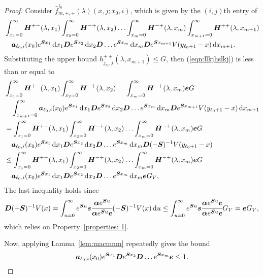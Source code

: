 \begin{proof}
	Consider \(\widehat f^{\ell_0}_{m,+,+}(\lambda)(x,j;x_0,i) \), which is given by the \((i,j)\)th entry of
        \begin{align}
        	&\int_{x_1=0}^\infty \boldsymbol H^{+-}(\lambda,x_1)\nonumber
	\int_{x_2=0}^\infty \boldsymbol H^{-+}(\lambda,x_2) 
	\hdots \int_{x_m=0}^\infty \boldsymbol H^{-+}(\lambda, x_m) 
	\int_{x_{m+1}=0}^\infty \boldsymbol H^{++}(\lambda,x_{m+1}) 
	\\&\quad\boldsymbol   a_{\ell_0,i}(x_0)e^{\boldsymbol{S}x_1}\, \mathrm{d} x_1 \boldsymbol{D}e^{\boldsymbol{S}x_2} \, \mathrm{d} x_2 \boldsymbol{D}\dots e^{\boldsymbol{S}x_m} \, \mathrm{d} x_m \boldsymbol{D}e^{\boldsymbol{S}x_{m+1}}V(y_{\ell_0+1}-x) \, \mathrm{d} x_{m+1}. \label{eqn:llkjhslkj}
\end{align}
	Substituting the upper bound \(h^{++}_{j_m,j}(\lambda,x_{m+1})\leq G\), then (\ref{eqn:llkjhslkj}) is less than or equal to 
	\begin{align}
	&\int_{x_1=0}^\infty \boldsymbol H^{+-}(\lambda,x_1)\nonumber
	\int_{x_2=0}^\infty \boldsymbol H^{-+}(\lambda,x_2) 
	\hdots \int_{x_m=0}^\infty \boldsymbol H^{-+}(\lambda, x_m) \boldsymbol eG
	\\&\quad\int_{x_{m+1}=0}^\infty \boldsymbol   a_{\ell_0,i}(x_0)e^{\boldsymbol{S}x_1}\, \mathrm{d} x_1 \boldsymbol{D}e^{\boldsymbol{S}x_2} \, \mathrm{d} x_2 \boldsymbol{D}\dots e^{\boldsymbol{S}x_m} \, \mathrm{d} x_m \boldsymbol{D}e^{\boldsymbol{S}x_{m+1}}V(y_{\ell_0+1}-x)\, \mathrm{d} x_{m+1} \nonumber
	\\&=\int_{x_1=0}^\infty \boldsymbol H^{+-}(\lambda,x_1)\nonumber
	\int_{x_2=0}^\infty \boldsymbol H^{-+}(\lambda,x_2) 
	\hdots \int_{x_m=0}^\infty \boldsymbol H^{-+}(\lambda, x_m) \boldsymbol eG
	\\&\quad \boldsymbol   a_{\ell_0,i}(x_0)e^{\boldsymbol{S}x_1}\, \mathrm{d} x_1 \boldsymbol{D}e^{\boldsymbol{S}x_2} \, \mathrm{d} x_2 \boldsymbol{D}\dots e^{\boldsymbol{S}x_m} \, \mathrm{d} x_m \boldsymbol{D}(-\boldsymbol{S})^{-1}V(y_{\ell_0+1}-x) \nonumber
	\\&\leq\int_{x_1=0}^\infty \boldsymbol H^{+-} (\lambda,x_1)\nonumber
	\int_{x_2=0}^\infty \boldsymbol H^{-+} (\lambda,x_2) 
	\hdots \int_{x_m=0}^\infty \boldsymbol H^{-+} (\lambda, x_m) \boldsymbol eG
	\\&\quad\boldsymbol   a_{\ell_0,i}(x_0)e^{\boldsymbol{S}x_1}\, \mathrm{d} x_1 \boldsymbol{D}e^{\boldsymbol{S}x_2} \, \mathrm{d} x_2 \boldsymbol{D}\dots e^{\boldsymbol{S}x_m} \, \mathrm{d} x_m \boldsymbol eG_V, \label{eqn: this 12}	
        \end{align}
        The last inequality holds since 
        \[\boldsymbol D(-\boldsymbol S)^{-1}V(x) = \int_{u=0}^\infty e^{\boldsymbol Su}\boldsymbol s\cfrac{\boldsymbol \alpha e^{\boldsymbol S u}}{\boldsymbol \alpha e^{\boldsymbol S u}\boldsymbol e}(-\boldsymbol S)^{-1}V(x)\, \mathrm{d} u \leq \int_{u=0}^\infty e^{\boldsymbol Su}\boldsymbol s\cfrac{\boldsymbol \alpha e^{\boldsymbol S u}\boldsymbol e}{\boldsymbol \alpha e^{\boldsymbol S u}\boldsymbol e}G_V = \boldsymbol eG_V,\]
        which relies on Property~\ref{properties: 1}. 
        
	Now, applying Lamma~\ref{lem:macmnm} repeatedly gives the bound  
	\[\boldsymbol   a_{\ell_0,i}(x_0)e^{\boldsymbol{S}x_1}\boldsymbol{D}e^{\boldsymbol{S}x_2} \boldsymbol{D}\dots e^{\boldsymbol{S}x_m} \boldsymbol e \leq 1.\]


\end{proof}

